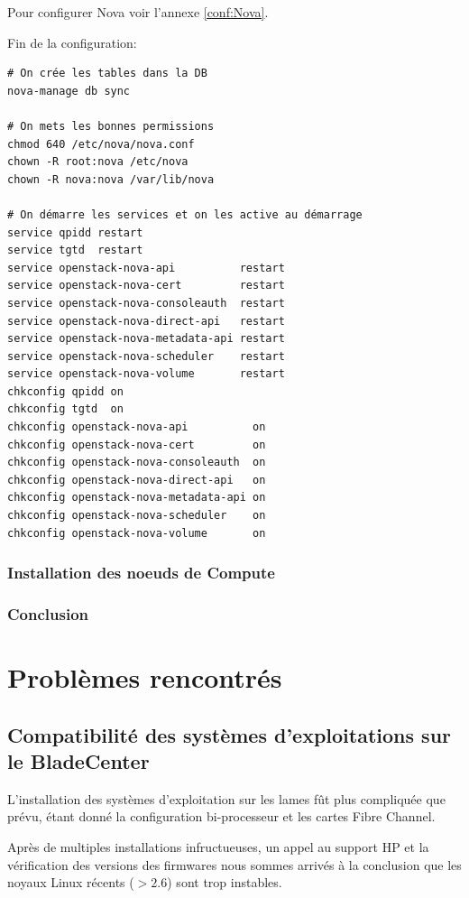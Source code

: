 \documentclass[a4paper,oneside]{report}
\begin{document}
\noindent Pour configurer Nova voir l'annexe \ref{conf:Nova}.

\noindent Fin de la configuration:
\begin{verbatim}
# On crée les tables dans la DB
nova-manage db sync

# On mets les bonnes permissions
chmod 640 /etc/nova/nova.conf
chown -R root:nova /etc/nova
chown -R nova:nova /var/lib/nova

# On démarre les services et on les active au démarrage
service qpidd restart
service tgtd  restart
service openstack-nova-api          restart
service openstack-nova-cert         restart
service openstack-nova-consoleauth  restart
service openstack-nova-direct-api   restart
service openstack-nova-metadata-api restart
service openstack-nova-scheduler    restart
service openstack-nova-volume       restart
chkconfig qpidd on
chkconfig tgtd  on
chkconfig openstack-nova-api          on
chkconfig openstack-nova-cert         on
chkconfig openstack-nova-consoleauth  on
chkconfig openstack-nova-direct-api   on
chkconfig openstack-nova-metadata-api on
chkconfig openstack-nova-scheduler    on
chkconfig openstack-nova-volume       on
\end{verbatim}

\subsection{Installation des noeuds de Compute}



\subsection{Conclusion}


\chapter{Problèmes rencontrés}
\section{Compatibilité des systèmes d'exploitations sur le BladeCenter}
\label{sec:compatblade}
L'installation des systèmes d'exploitation sur les lames fût plus compliquée que prévu, étant donné la configuration bi-processeur et les cartes Fibre Channel.

Après de multiples installations infructueuses, un appel au support HP et la vérification des versions des firmwares nous sommes arrivés à la conclusion que les noyaux Linux récents ($ > 2.6 $) sont trop instables.
\end{document}
